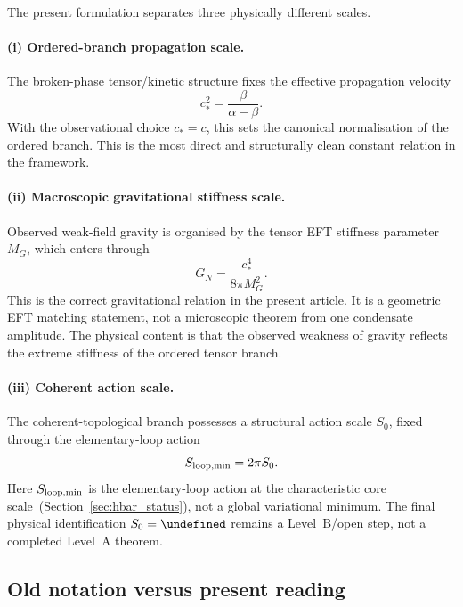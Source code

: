 \documentclass[11pt,a4paper]{article}
\let\hbar\undefined
\numberwithin{equation}{section}
\begin{document}
The present formulation separates three physically different scales.

\paragraph{(i) Ordered-branch propagation scale.}
The broken-phase tensor/kinetic structure fixes the effective
propagation velocity
\begin{equation}
  c_*^2 = \frac{\beta}{\alpha-\beta}.
\end{equation}
With the observational choice $c_*=c$, this sets the canonical
normalisation of the ordered branch.
This is the most direct and structurally clean constant relation in the
framework.

\paragraph{(ii) Macroscopic gravitational stiffness scale.}
Observed weak-field gravity is organised by the tensor EFT stiffness
parameter $M_G$, which enters through
\begin{equation}
  G_N = \frac{c_*^4}{8\pi M_G^2}.
\end{equation}
This is the correct gravitational relation in the present article.
It is a geometric EFT matching statement, not a microscopic theorem from
one condensate amplitude.
The physical content is that the observed weakness of gravity reflects
the extreme stiffness of the ordered tensor branch.

\paragraph{(iii) Coherent action scale.}
The coherent-topological branch possesses a structural action scale
$S_0$, fixed through the elementary-loop action
\begin{equation}
  S_{\rm loop,min}=2\pi S_0.
\end{equation}
Here $S_{\rm loop,min}$ is the elementary-loop action at the
characteristic core scale~(Section~\ref{sec:hbar_status}),
not a global variational minimum.
The final physical identification $S_0=\hbar$ remains a Level~B/open
step, not a completed Level~A theorem.

\subsection*{Old notation versus present reading}
\end{document}

